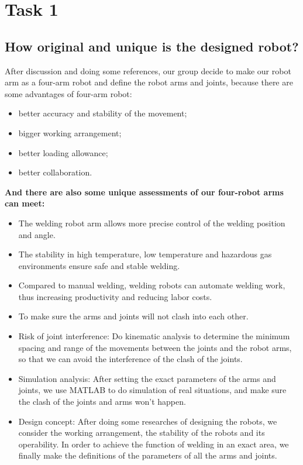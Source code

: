 \section{Task 1}
\FloatBarrier %


\subsection{How original and unique is the designed robot?}

After discussion and doing some references, our group decide to make our robot arm as a four-arm robot and define the robot arms and joints, because there are some advantages of four-arm robot:

\begin{itemize}
\item better accuracy and stability of the movement;
\item bigger working arrangement;
\item better loading allowance;
\item better collaboration.
\end{itemize}


\textbf{And there are also some unique assessments of our four-robot arms can meet:}

\begin{itemize}
\item The welding robot arm allows more precise control of the welding position and angle.
\item The stability in high temperature, low temperature and hazardous gas environments ensure safe and stable welding.
\item Compared to manual welding, welding robots can automate welding work, thus increasing productivity and reducing labor costs.
\item To make sure the arms and joints will not clash into each other.
\item Risk of joint interference: Do kinematic analysis to determine the minimum spacing and range of the movements between the joints and the robot arms, so that we can avoid the interference of the clash of the joints.
\item Simulation analysis: After setting the exact parameters of the arms and joints, we use MATLAB to do simulation of real situations, and make sure the clash of the joints and arms won't happen.
\item Design concept: After doing some researches of designing the robots, we consider the working arrangement, the stability of the robots and its operability. In order to achieve the function of welding in an exact area, we finally make the definitions of the parameters of all the arms and joints.
\end{itemize}


